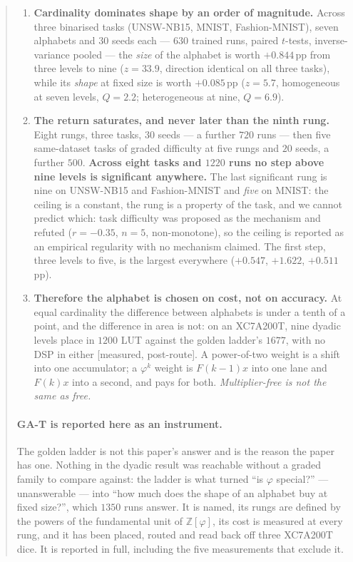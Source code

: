 \begin{abstract}
\begin{enumerate}
\item \textbf{Cardinality dominates shape by an order of magnitude.} Across three
binarised tasks (UNSW-NB15, MNIST, Fashion-MNIST), seven alphabets and $30$ seeds
each --- $630$ trained runs, paired $t$-tests, inverse-variance pooled --- the
\emph{size} of the alphabet is worth $+0.844$\,pp from three levels to nine
($z=33.9$, direction identical on all three tasks), while its \emph{shape} at
fixed size is worth $+0.085$\,pp ($z=5.7$, homogeneous at seven levels,
$Q=2.2$; heterogeneous at nine, $Q=6.9$).

\item \textbf{The return saturates, and never later than the ninth rung.} Eight
rungs, three tasks, $30$ seeds --- a further $720$ runs --- then five
same-dataset tasks of graded difficulty at five rungs and $20$ seeds, a further
$500$. \textbf{Across eight tasks and $1220$ runs no step above nine levels is
significant anywhere.} The last significant rung is nine on UNSW-NB15 and
Fashion-MNIST and \emph{five} on MNIST: the ceiling is a constant, the rung is a
property of the task, and we cannot predict which: task difficulty was proposed
as the mechanism and refuted ($r=-0.35$, $n=5$, non-monotone), so the ceiling is
reported as an empirical regularity with no mechanism claimed. The first step,
three levels to five, is the largest everywhere ($+0.547$, $+1.622$, $+0.511$\,pp).

\item \textbf{Therefore the alphabet is chosen on cost, not on accuracy.} At
equal cardinality the difference between alphabets is under a tenth of a point,
and the difference in area is not: on an XC7A200T, nine dyadic levels place in
$1200$ LUT against the golden ladder's $1677$, with no DSP in either
\textup{[measured, post-route]}. A power-of-two weight is a shift into one
accumulator; a $\varphi^k$ weight is $F(k{-}1)x$ into one lane and $F(k)x$ into a
second, and pays for both. \emph{Multiplier-free is not the same as free.}
\end{enumerate}

\paragraph{GA-T is reported here as an instrument.}
The golden ladder is not this paper's answer and is the reason the paper has one.
Nothing in the dyadic result was reachable without a graded family to compare
against: the ladder is what turned ``is $\varphi$ special?'' --- unanswerable ---
into ``how much does the shape of an alphabet buy at fixed size?'', which
$1350$ runs answer. It is named, its rungs are defined by the powers of the
fundamental unit of $\mathbb{Z}[\varphi]$, its cost is measured at every rung,
and it has been placed, routed and read back off three XC7A200T dice. It is
reported in full, including the five measurements that exclude it.


\end{abstract}
